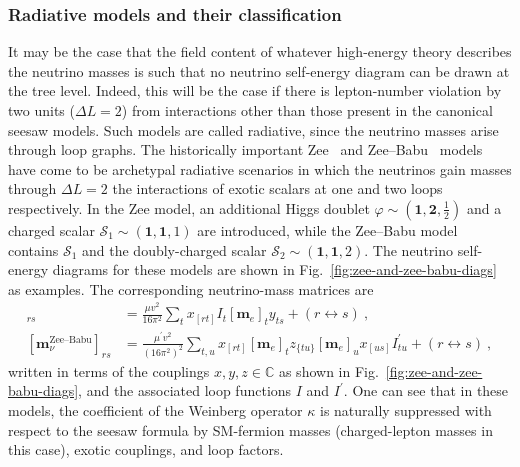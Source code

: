 \subsubsection{Radiative models and their classification}

It may be the case that the field content of whatever high-energy theory
describes the neutrino masses is such that no neutrino self-energy diagram can
be drawn at the tree level. Indeed, this will be the case if there is
lepton-number violation by two units ($\Delta L = 2$) from interactions other
than those present in the canonical seesaw models. Such models are called
radiative, since the neutrino masses arise through loop graphs. The historically
important Zee~\cite{Zee:1980ai} and Zee--Babu~\cite{Zee:1985id, Babu:1988ki}
models have come to be archetypal radiative scenarios in which the neutrinos
gain masses through $\Delta L = 2$ the interactions of exotic scalars at one and
two loops respectively. In the Zee model, an additional Higgs doublet
$\varphi \sim (\mathbf{1}, \mathbf{2}, \tfrac{1}{2})$ and a charged scalar
$\mathcal{S}_{1} \sim (\mathbf{1}, \mathbf{1}, 1)$ are introduced, while the
Zee--Babu model contains $\mathcal{S}_{1}$ and the doubly-charged scalar
$\mathcal{S}_{2} \sim (\mathbf{1}, \mathbf{1}, 2)$. The neutrino self-energy
diagrams for these models are shown in Fig.~\ref{fig:zee-and-zee-babu-diags} as
examples. The corresponding neutrino-mass matrices are
\begin{align}
  [\mathbf{m}^{\text{Zee}}_\nu]_{rs} & = \frac{\mu v^2}{16\pi^2} \sum_t x_{[rt]} I_{t} [\mathbf{m}_e]_t y_{ts} + (r \leftrightarrow s) \ , \label{eq:zee-mv} \\
  [\mathbf{m}^{\text{Zee--Babu}}_\nu]_{rs} & = \frac{\mu^{\prime} v^2}{(16 \pi^2)^2} \sum_{t,u} x_{[rt]} [\mathbf{m}_e]_t z_{\{tu\}} [\mathbf{m}_e]_u x_{[us]} I^\prime_{tu} + (r \leftrightarrow s) \ , \label{eq:zee-babu-mv}
\end{align}
written in terms of the couplings $x,y,z \in \mathbb{C}$ as shown in
Fig.~\ref{fig:zee-and-zee-babu-diags}, and the associated loop functions $I$ and
$I^{\prime}$. One can see that in these models, the coefficient of the Weinberg
operator $\kappa$ is naturally suppressed with respect to the seesaw formula by
SM-fermion masses (charged-lepton masses in this case), exotic couplings, and
loop factors.

